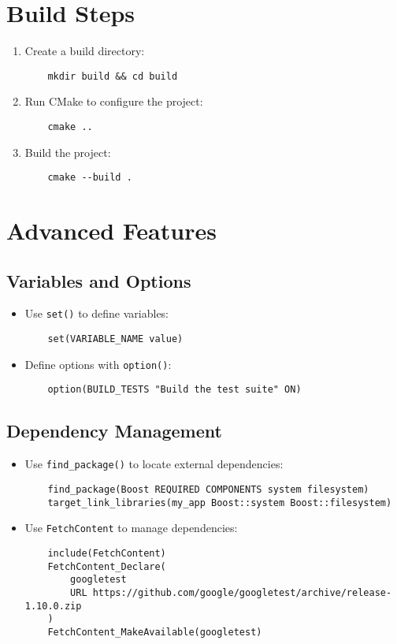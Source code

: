 \section{Build Steps}
\begin{enumerate}
    \item Create a build directory:
    \begin{verbatim}
    mkdir build && cd build
    \end{verbatim}
    \item Run CMake to configure the project:
    \begin{verbatim}
    cmake ..
    \end{verbatim}
    \item Build the project:
    \begin{verbatim}
    cmake --build .
    \end{verbatim}
\end{enumerate}

\section{Advanced Features}
\subsection{Variables and Options}
\begin{itemize}
    \item Use \texttt{set()} to define variables:
    \begin{verbatim}
    set(VARIABLE_NAME value)
    \end{verbatim}
    \item Define options with \texttt{option()}:
    \begin{verbatim}
    option(BUILD_TESTS "Build the test suite" ON)
    \end{verbatim}
\end{itemize}

\subsection*{Dependency Management}
\begin{itemize}
    \item Use \texttt{find\_package()} to locate external dependencies:
    \begin{verbatim}
    find_package(Boost REQUIRED COMPONENTS system filesystem)
    target_link_libraries(my_app Boost::system Boost::filesystem)
    \end{verbatim}
    \item Use \texttt{FetchContent} to manage dependencies:
    \begin{verbatim}
    include(FetchContent)
    FetchContent_Declare(
        googletest
        URL https://github.com/google/googletest/archive/release-1.10.0.zip
    )
    FetchContent_MakeAvailable(googletest)
    \end{verbatim}
\end{itemize}

